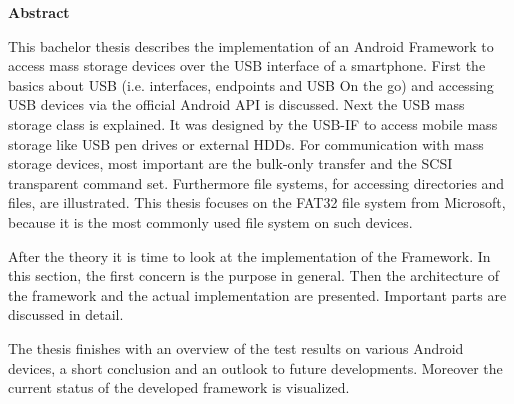 

\clearemptydoublepage
{}
{}	





\vspace*{2cm}
\begin{center}
{\Large \bf Abstract}
\end{center}
\vspace{1cm}

This bachelor thesis describes the implementation of an Android Framework to access mass storage devices over the USB interface of a smartphone. First the basics about USB (i.e. interfaces, endpoints and USB On the go) and accessing USB devices via the official Android API is discussed. Next the USB mass storage class is explained. It was designed by the USB-IF to access mobile mass storage like USB pen drives or external HDDs. For communication with mass storage devices, most important are the bulk-only transfer and the SCSI transparent command set. Furthermore file systems, for accessing directories and files, are illustrated. This thesis focuses on the FAT32 file system from Microsoft, because it is the most commonly used file system on such devices.

After the theory it is time to look at the implementation of the Framework. In this section, the first concern is the purpose in general. Then the architecture of the framework and the actual implementation are presented. Important parts are discussed in detail.

The thesis finishes with an overview of the test results on various Android devices, a short conclusion and an outlook to future developments. Moreover the current status of the developed framework is visualized. 